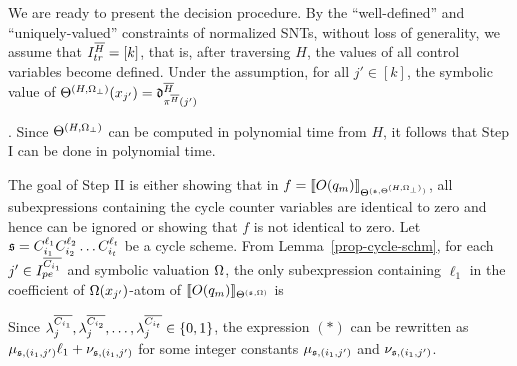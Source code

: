 We are ready to present the decision procedure. By the ``well-defined'' and ``uniquely-valued'' constraints of normalized SNTs, without loss of generality, we assume that $I^{\overline{H}}_{tr}=[k]$, that is, after traversing $H$, the values of all control variables become defined.
Under the assumption, for all $j' \in [k]$, the symbolic value of $\Theta^{(H,\Omega_\bot)}(x_{j'})=\mathfrak{d}^{\overline{H}}_{\pi^{\overline{H}}(j')}$\smallskip\\
\bigskip

. Since $\Theta^{(H,\Omega_\bot)}$ can be computed in polynomial time from $H$, it follows that Step I can be done in polynomial time.

\smallskip

The goal of Step II is either showing that in $f=\llbracket O(q_m)\rrbracket_{\Theta^{({\mathfrak{s} },\Theta^{(H,\Omega_\bot)})}}$, all subexpressions containing the cycle counter variables are identical to zero and hence can be ignored or showing that $f$ is not identical to zero. Let ${\mathfrak{s} }=C_{i_1}^{\ell_1} C_{i_2}^{\ell_2} \dots C_{i_t}^{\ell_t}$ be a cycle scheme. From Lemma~\ref{prop-cycle-schm}, for each $j'\in I^{\overline{C_{i_1}}}_{pe}$ and symbolic valuation $\Omega$, the only subexpression containing $\ell_1$ in the coefficient of $\Omega(x_{j'})$-atom of $\llbracket O(q_m)\rrbracket_{\Theta^{({\mathfrak{s} },\Omega)}}$ is
\begin{center}
\end{center}
Since $\lambda^{\overline{C_{i_1}}}_{j}, \lambda^{\overline{C_{i_2}}}_{j}, \dots, \lambda^{\overline{C_{i_t}}}_{j} \in \{0, 1\}$, the expression $(\ast)$  can be rewritten as  
 $\mu_{{\mathfrak{s} }, (i_1,j')} \ell_1 + \nu_{{\mathfrak{s} }, (i_1,j')}$ for some integer constants $\mu_{{\mathfrak{s} }, (i_1,j')}$ and $\nu_{{\mathfrak{s} }, (i_1,j')}$. 
 
